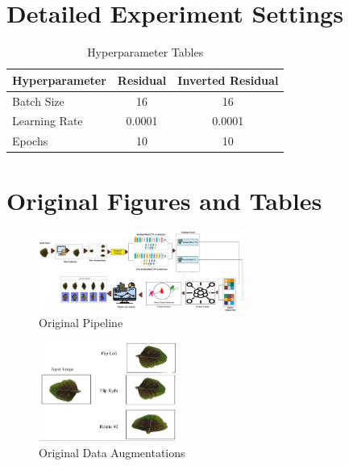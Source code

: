 \documentclass[journal,onecolumn]{IEEEtran}
\begin{document}
\section{Detailed Experiment Settings}
\begin{table}[H]
  \centering
  \caption{Hyperparameter Tables}
  \label{tab:hyperparameters}
  \begin{tabular}{lcc}
    \hline
    \textbf{Hyperparameter} & \textbf{Residual} & \textbf{Inverted Residual} \\
    \hline
    Batch Size & 16 & 16 \\
    Learning Rate & 0.0001 & 0.0001 \\
    Epochs & 10 & 10 \\
    \hline
  \end{tabular}
\end{table}

\section{Original Figures and Tables}
\begin{figure}[H]
  \centering
  \includegraphics[width=0.6\textwidth]{figs/1-s2.0-S2405844025007650-fig.001.jpg}
  \caption{Original Pipeline}
  \label{fig:original_pipeline}
\end{figure}

\begin{figure}[H]
  \centering
  \includegraphics[width=0.4\textwidth]{figs/1-s2.0-S2405844025007650-fig.002.jpg}
  \caption{Original Data Augmentations}
  \label{fig:original_data_augmentations}
\end{figure}
\end{document}
